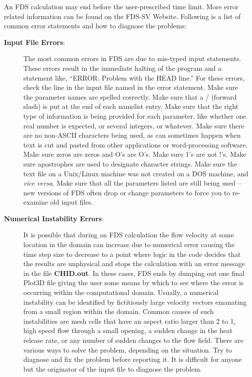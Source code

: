 \documentclass[11pt]{book}
\begin{document}
An FDS calculation may end before the user-prescribed time limit.
More error related information can be found on the FDS-SV Website.
Following is a list of common error statements and how to diagnose the problems:
\begin{description}
\item[{\bf Input File Errors}:] The most common errors in FDS are due to mis-typed input statements.
These errors result in the immediate halting of the program and a statement like, ``ERROR: Problem
with the HEAD line.'' For these errors, check the line in the input file named in the error statement.
Make sure the parameter names are spelled correctly. Make sure that a / (forward slash)
is put at the end of each namelist entry. Make sure that the right type of information is
being provided for each parameter, like whether one real number is expected, or several integers, or
whatever. Make sure there are no non-ASCII characters being used, as can sometimes happen when text is
cut and pasted from other applications or word-processing software. Make sure zeros are zeros and
O's are O's. Make sure 1's are not !'s. Make sure apostrophes are used to designate character strings.
Make sure the text file on a Unix/Linux machine was not created on a DOS machine, and {\em vice versa}.
Make sure that all the parameters listed are still being used -- new versions of FDS often drop or
change parameters to force you to re-examine old input files.

\item [{\bf Numerical Instability Errors}:] It is possible that during an FDS calculation the flow
velocity at some location in the domain can increase due to numerical error causing the time step
size to decrease to a point where logic in the code decides that the results are unphysical
and stops the calculation with an error message in the file {\bf CHID.out}.
In these cases, FDS ends by dumping out one final
Plot3D file giving the user some means by which to see where the
error is occurring within the computational domain. Usually, a numerical
instability can be identified by fictitiously large velocity vectors emanating from
a small region within the domain. Common causes of such instabilities are
mesh cells that have an aspect ratio larger than 2 to 1, high speed flow through a small
opening, a sudden change in the heat release rate, or any number of sudden changes to the
flow field. There are various ways to solve the problem, depending on the situation.
Try to diagnose and fix the problem before reporting it. It is difficult
for anyone but the originator of the input file to diagnose the problem.


\end{description}
\end{document}
